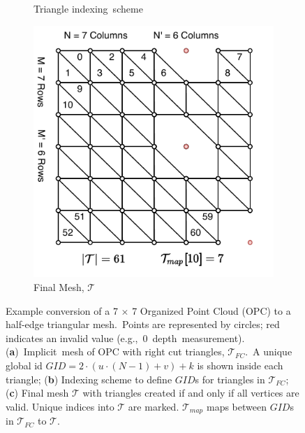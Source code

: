 \begin{figure}[H]
\begin{subfigure}[t]{.33\linewidth}
    \caption{\label{fig:ch3_OPC_HE} Triangle indexing~scheme}\vspace{6pt}
  \end{subfigure}
  \begin{subfigure}[t]{.33\linewidth}
     \centering\includegraphics[width=.95\linewidth]{chapter_3_polylidar3d/imgs/OPCHalfEdge-OPC-Mesh_actual_V2.pdf}
    \caption{\label{fig:ch3_OPC_Mesh} Final Mesh, $\mathcal{T}$ }\vspace{6pt}
  \end{subfigure}
  \caption{Example conversion of a 7 $\times$ 7 Organized Point Cloud (OPC) to a half-edge triangular mesh.~Points are represented by circles; red indicates an invalid value (e.g.,~0~depth~measurement). (\textbf{a})~Implicit~mesh of OPC with right cut triangles, $\mathcal{T}_{FC}$.~A unique global id $GID = 2 \cdot (u \cdot (N-1) + v) + k$ is shown inside each triangle;  (\textbf{b}) Indexing scheme to define $GID$s for triangles in $\mathcal{T}_{FC}$; (\textbf{c}) Final mesh $\mathcal{T}$ with triangles created if and only if all vertices are valid. Unique indices into $\mathcal{T}$  are marked.  $\mathcal{T}_{map}$ maps between $GID$s in $\mathcal{T}_{FC}$ to $\mathcal{T}$. }\label{fig:ch3_OPC_Mesh_all}
\end{figure}
